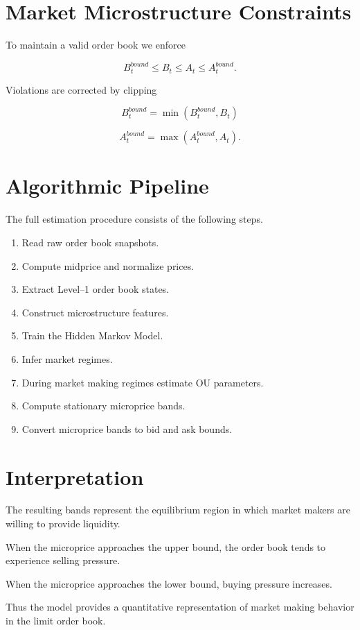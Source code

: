\documentclass[11pt]{article}
\begin{document}
\section{Market Microstructure Constraints}

To maintain a valid order book we enforce

\[
B_t^{bound} \le B_t \le A_t \le A_t^{bound}.
\]

Violations are corrected by clipping

\[
B_t^{bound} = \min(B_t^{bound},B_t)
\]

\[
A_t^{bound} = \max(A_t^{bound},A_t).
\]

\section{Algorithmic Pipeline}

The full estimation procedure consists of the following steps.

\begin{enumerate}
\item Read raw order book snapshots.
\item Compute midprice and normalize prices.
\item Extract Level--1 order book states.
\item Construct microstructure features.
\item Train the Hidden Markov Model.
\item Infer market regimes.
\item During market making regimes estimate OU parameters.
\item Compute stationary microprice bands.
\item Convert microprice bands to bid and ask bounds.
\end{enumerate}

\section{Interpretation}

The resulting bands represent the equilibrium region in which market makers are willing to provide liquidity.

When the microprice approaches the upper bound, the order book tends to experience selling pressure.

When the microprice approaches the lower bound, buying pressure increases.

Thus the model provides a quantitative representation of market making behavior in the limit order book.
\end{document}
